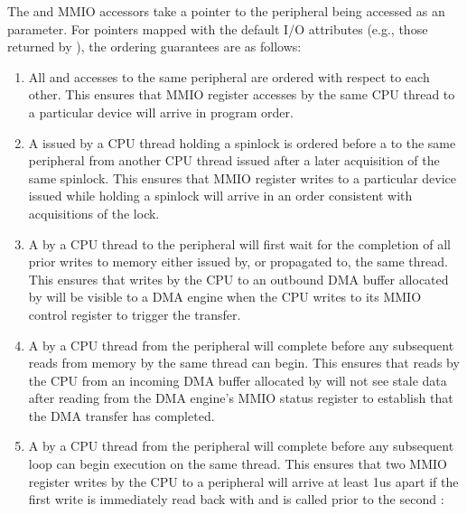 \begin{description}[style=nextline]
 \item[\tco{readX()}, \tco{writeX()}:]
	The  and  MMIO accessors take a pointer to
	the peripheral being accessed as an  parameter.
	For pointers mapped with the default I/O attributes (e.g., those
        returned by ), the ordering guarantees are as follows:

	\begin{enumerate}
	 \item
	   All  and  accesses to the same peripheral
	   are ordered with respect to each other.
	   This ensures that MMIO register accesses by the same CPU thread to
	   a particular device will arrive in program order.

	 \item
	   A  issued by a CPU thread holding a spinlock is ordered
	   before a  to the same peripheral from another CPU thread
	   issued after a later acquisition of the same spinlock.
	   This ensures that MMIO register writes to a particular device
	   issued while holding a spinlock will arrive in an order consistent
	   with acquisitions of the lock.

	 \item
	   A  by a CPU thread to the peripheral will first wait
	   for the completion of all prior writes to memory either issued by, or
	   propagated to, the same thread.
	   This ensures that writes by the CPU to an outbound DMA buffer
	   allocated by  will be visible to a DMA
	   engine when the CPU writes to its MMIO control register to trigger
	   the transfer.

	 \item
	   A  by a CPU thread from the peripheral will complete
	   before any subsequent reads from memory by the same thread can begin.
	   This ensures that reads by the CPU from an incoming DMA buffer
	   allocated by  will not see stale data
	   after reading from the DMA engine's MMIO status register to
	   establish that the DMA transfer has completed.

	 \item
	   A  by a CPU thread from the peripheral will complete
	   before any subsequent  loop can begin execution on the
	   same thread.
	   This ensures that two MMIO register writes by the CPU to a peripheral
	   will arrive at least 1us apart if the first write is immediately read
	   back with  and  is called prior to the
	   second :


\end{enumerate}
\end{description}

